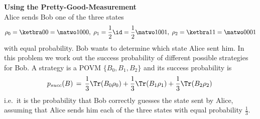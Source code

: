 \chapter{}




\begin{exercises}

\item {\bf Using the Pretty-Good-Measurement}\\
Alice sends Bob one of the three states 
\[\rho_0 = \ketbra 00 = \matwo1000,\; \rho_1 = \frac12 \id=\frac12\matwo 1001,\; \rho_2 = \ketbra 11 = \matwo0001\]
 with equal probability. Bob wants to determine which state Alice sent him. In this problem we work out the success probability of different possible strategies for Bob. A strategy is a POVM $\{B_0,B_1,B_2\}$ and its success probability is 
\[ p_{succ}(B) \,=\, \frac{1}{3} \Tr(B_0\rho_0) + \frac{1}{3}\Tr(B_1\rho_1)+\frac{1}{3}\Tr(B_2\rho_2)\,\]
i.e.\ it is the probability that Bob correctly guesses the state sent by Alice, assuming that Alice sends him each of the three states with equal probability $\frac{1}{3}$. 


\end{exercises}
